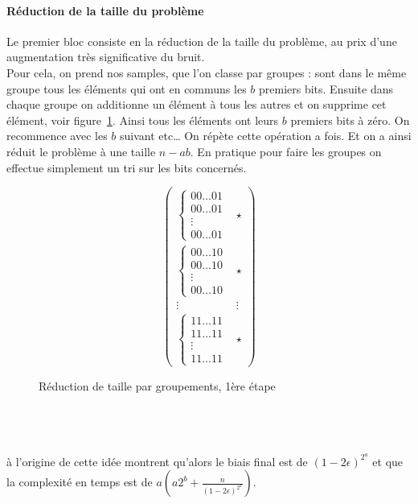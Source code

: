 \documentclass{article}		%
\theoremstyle{definition}
\theoremstyle{plain}
\theoremstyle{plain}
\theoremstyle{plain}
\theoremstyle{plain}
\begin{document}
\paragraph{Réduction de la taille du problème}
Le premier bloc consiste en la réduction de la taille du problème, au
prix d'une augmentation très significative du bruit.
\\
Pour cela, on prend nos samples, que l'on classe par groupes : sont dans
le même groupe tous les éléments qui ont en communs les $b$ premiers bits.
Ensuite dans chaque groupe on additionne un élément à tous les autres et
on supprime cet élément, voir figure~\ref{bbkw}. Ainsi tous les éléments ont leurs $b$ premiers
bits à zéro. On recommence avec les $b$ suivant etc\dots
On répète cette opération a fois. Et on a ainsi réduit le problème à une
taille $n-ab$. En pratique pour faire les groupes on effectue simplement
un tri sur les bits concernés.
\begin{figure}
$$\begin{pmatrix}
\begin{cases}00\dots01 \\00\dots01\\ \vdots\\00\dots01 \end{cases} & \star \\
\begin{cases} 00\dots10 \\00\dots10\\ \vdots\\00\dots10  \end{cases} & \star  \\
\vdots & \vdots \\
\begin{cases} 11\dots11 \\11\dots11\\ \vdots\\11\dots11  \end{cases} & \star 
\end{pmatrix}$$
\caption{Réduction de taille par groupements, 1ère étape}
\label{bbkw}
\end{figure}
\\
\\
\\
\cite{BKW} à l'origine de cette idée montrent qu'alors le biais final est
de $(1-2\epsilon)^{2^a}$ et que la complexité en temps est de
$a(a2^b+\frac {n} {(1-2\epsilon)^{2^a}})$.
\end{document}
